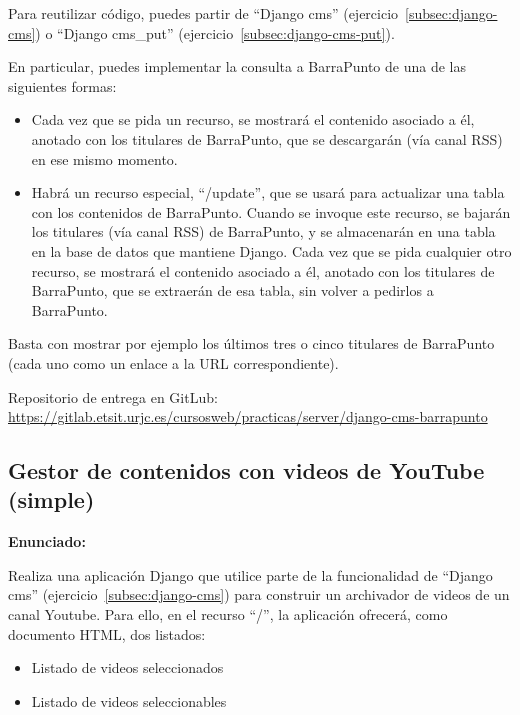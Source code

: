Para reutilizar código, puedes partir de ``Django cms'' (ejercicio~\ref{subsec:django-cms}) o  ``Django cms\_put'' (ejercicio~\ref{subsec:django-cms-put}).

En particular, puedes implementar la consulta a BarraPunto de una de las siguientes formas:

\begin{itemize}
\item Cada vez que se pida un recurso, se mostrará el contenido asociado a él, anotado con los titulares de BarraPunto, que se descargarán (vía canal RSS) en ese mismo momento.
\item Habrá un recurso especial, ``/update'', que se usará para actualizar una tabla con los contenidos de BarraPunto. Cuando se invoque este recurso, se bajarán los titulares (vía canal RSS) de BarraPunto, y se almacenarán en una tabla en la base de datos que mantiene Django. Cada vez que se pida cualquier otro recurso, se mostrará el contenido asociado a él, anotado con los titulares de BarraPunto, que se extraerán de esa tabla, sin volver a pedirlos a BarraPunto.
\end{itemize}

Basta con mostrar por ejemplo los últimos tres o cinco titulares de BarraPunto (cada uno como un enlace a la URL correspondiente).

Repositorio de entrega en  GitLub: \\
\url{https://gitlab.etsit.urjc.es/cursosweb/practicas/server/django-cms-barrapunto}

\subsection{Gestor de contenidos con videos de YouTube (simple)}
\label{subsec:django-cms-youtube}

\textbf{Enunciado:}

Realiza una aplicación Django que utilice parte de la funcionalidad de ``Django cms'' (ejercicio~\ref{subsec:django-cms}) para construir un archivador de videos de un canal Youtube. Para ello, en el recurso ``/'', la aplicación ofrecerá, como documento HTML, dos listados:

\begin{itemize}
\item Listado de videos seleccionados
\item Listado de videos seleccionables
\end{itemize}

